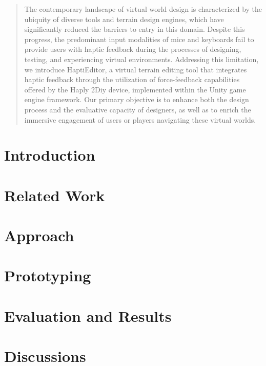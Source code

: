 \documentclass[manuscript,screen,review, nonacm=true]{acmart}
\begin{document}


\begin{abstract}
The contemporary landscape of virtual world design is characterized by the ubiquity of diverse tools and terrain design engines, which have significantly reduced the barriers to entry in this domain. Despite this progress, the predominant input modalities of mice and keyboards fail to provide users with haptic feedback during the processes of designing, testing, and experiencing virtual environments. Addressing this limitation, we introduce HaptiEditor, a virtual terrain editing tool that integrates haptic feedback through the utilization of force-feedback capabilities offered by the Haply 2Diy device, implemented within the Unity game engine framework. Our primary objective is to enhance both the design process and the evaluative capacity of designers, as well as to enrich the immersive engagement of users or players navigating these virtual worlds.  
\end{abstract}


\maketitle

\section{Introduction} \label{sec:intro}


\section{Related Work} \label{sec:rel_work}


\section{Approach} \label{sec:approach}


\section{Prototyping} \label{sec:prototyping}


\section{Evaluation and Results} \label{sec:evaluation}


\section{Discussions} \label{sec:discussions}









\end{document}
